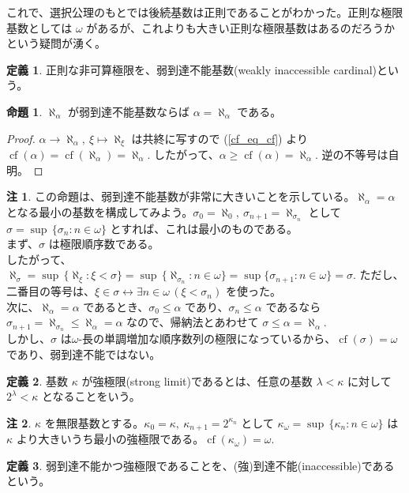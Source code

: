 \documentclass{jsarticle}
\theoremstyle{definition}
\newtheorem*{definition*}{定義}
\newtheorem{proposition}[theorem]{命題}
\newtheorem{remark}{注}[section]
\begin{document}
    \vspace{1.0ex}
    これで、選択公理のもとでは後続基数は正則であることがわかった。正則な極限基数としては $\omega$ があるが、これよりも大きい正則な極限基数はあるのだろうかという疑問が湧く。
    
    \begin{definition*}
        正則な非可算極限を、弱到達不能基数(weakly inaccessible cardinal)という。
    \end{definition*}
    \begin{proposition}
        $\aleph_\alpha$ が弱到達不能基数ならば $\alpha = \aleph_\alpha$ である。
    \end{proposition}
    \begin{proof}
        $\alpha \rightarrow \aleph_\alpha, \ \xi \mapsto \aleph_\xi$ は共終に写すので (\ref{cf_eq_cf}) より $\operatorname{cf}(\alpha) = \operatorname{cf}(\aleph_\alpha) = \aleph_\alpha.$ したがって、$\alpha \geq \operatorname{cf}(\alpha) = \aleph_\alpha.$ 逆の不等号は自明。
    \end{proof}
    \begin{remark}
        この命題は、弱到達不能基数が非常に大きいことを示している。$\aleph_\alpha = \alpha$ となる最小の基数を構成してみよう。$\sigma_0 = \aleph_0, \ \sigma_{n+1} = \aleph_{\sigma_n}$ として $\sigma = \sup \, \{\sigma_n : n \in \omega\}$ とすれば、これは最小のものである。\\
        まず、$\sigma$ は極限順序数である。\\
        したがって、$\aleph_\sigma = \sup \, \{\aleph_\xi : \xi < \sigma\} = \sup \, \{\aleph_{\sigma_n} : n \in \omega\} = \sup \{\sigma_{n+1} : n \in \omega\} = \sigma.$ ただし、二番目の等号は、$\xi \in \sigma \leftrightarrow \exists n \in \omega \, (\xi < \sigma_n)$ を使った。\\
        次に、$\aleph_\alpha = \alpha$ であるとき、$\sigma_0 \leq \alpha$ であり、$\sigma_n \leq \alpha$ であるなら $\sigma_{n+1} = \aleph_{\sigma_n} \leq \aleph_{\alpha} = \alpha$ なので、帰納法とあわせて $\sigma \leq \alpha = \aleph_\alpha.$\\
        しかし、$\sigma$ は$\omega$-長の単調増加な順序数列の極限になっているから、$\operatorname{cf}(\sigma) = \omega$ であり、弱到達不能ではない。
    \end{remark}
    
    \vspace{1.0ex}
    
    \begin{definition*}
        基数 $\kappa$ が強極限(strong limit)であるとは、任意の基数 $\lambda < \kappa$ に対して $2^\lambda < \kappa$ となることをいう。
    \end{definition*}
    \begin{remark}
        $\kappa$ を無限基数とする。$\kappa_0 = \kappa, \ \kappa_{n+1} = 2^{\kappa_{n}}$ として $\kappa_{\omega} = \sup \, \{\kappa_n : n \in \omega\}$ は $\kappa$ より大きいうち最小の強極限である。$\operatorname{cf}(\kappa_\omega) = \omega.$
    \end{remark}
    \begin{definition*}
        弱到達不能かつ強極限であることを、(強)到達不能(inaccessible)であるという。
    \end{definition*}
    
\end{document}
